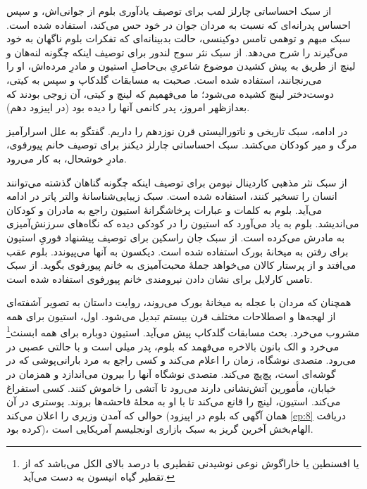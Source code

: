 \documentclass[12pt]{book}
\begin{document}
    از سبک احساساتی چارلز لمب برای توصیف یادآوری بلوم از جوانی‌اش، و سپس احساس پدرانه‌ای که نسبت به مردان جوان در خود حس می‌کند، استفاده شده است. سبک مبهم و توهمی تامس دوکینسی، حالت بدبینانه‌ای که تفکرات بلوم ناگهان به خود می‌گیرند را شرح می‌دهد. از سبک نثر سوج لندور برای توصیف اینکه چگونه لنه‌هان و لینچ از طریق به پیش کشیدن موضوع شاعریِ بی‌حاصلِ استیون و مادرِ مرده‌اش، او را می‌رنجانند، استفاده شده است. صحبت به مسابقات گلدکاپ و سپس به کیتی، دوست‌دختر لینچ کشیده می‌شود؛ ما می‌فهمیم که لینچ و کیتی، آن زوجی بودند که بعدازظهر امروز، پدر کانمی آنها را دیده بود (در اپیزود دهم).

    در ادامه، سبک تاریخی و ناتورالیستی قرن نوزدهم را داریم. گفتگو به علل اسرارآمیز مرگ و میر کودکان می‌کشد. سبک احساساتی چارلز دیکنز برای توصیف خانم پیورفوی، مادرِ خوشحال، به کار می‌رود.

    از سبک نثر مذهبی کاردینال نیومن برای توصیف اینکه چگونه گناهان گذشته می‌توانند انسان را تسخیر کنند، استفاده شده است. سبک زیبایی‌شناسانۀ والتر پاتر در ادامه می‌آید. بلوم به کلمات و عبارات پرخاشگرانۀ استیون راجع به مادران و کودکان می‌اندیشد. بلوم به یاد می‌آورد که استیون را در کودکی دیده که نگاه‌های سرزنش‌آمیزی به مادرش می‌کرده است. از سبک جان راسکین برای توصیف پیشنهاد فوریِ استیون برای رفتن به میخانۀ بورک استفاده شده است. دیکسون به آنها می‌پیوندد. بلوم عقب می‌افتد و از پرستار کالان می‌خواهد جملۀ محبت‌آمیزی به خانم پیورفوی بگوید. از سبک تامس کارلایل برای نشان دادن نیرومندی خانم پیورفوی استفاده شده است.

    همچنان که مردان با عجله به میخانۀ بورک می‌روند، روایت داستان به تصویر آشفته‌ای از لهجه‌ها و اصطلاحات مختلف قرن بیستم تبدیل می‌شود. اول، استیون برای همه مشروب می‌خرد. بحث مسابقات گلدکاپ پیش می‌آید. استیون دوباره برای همه ابسنث\footnote{یا افسنطین یا خاراگوش نوعی نوشیدنی تقطیری با درصد بالای الکل می‌باشد که از تقطیر گیاه انیسون به دست می‌آید.} می‌خرد و الک بانون بالاخره می‌فهمد که بلوم، پدر میلی است و با حالتی عصبی در می‌رود. متصدی نوشگاه، زمان را اعلام می‌کند و کسی راجع به مرد بارانی‌پوشی که در گوشه‌ای است، پچ‌پچ می‌کند. متصدی نوشگاه آنها را بیرون می‌اندازد و همزمان در خیابان، مأمورین آتش‌نشانی دارند می‌رود تا آتشی را خاموش کنند. کسی استفراغ می‌کند. استیون، لینچ را قانع می‌کند تا با او به محلۀ فاحشه‌ها بروند. پوستری در آن حوالی که آمدن وزیری را اعلان می‌کند (همان آگهی که بلوم در اپیزود \ref{ep:8} دریافت کرده بود)، الهام‌بخش آخرین گریز به سبک بازاری اونجلیسم آمریکایی است.
\end{document}
